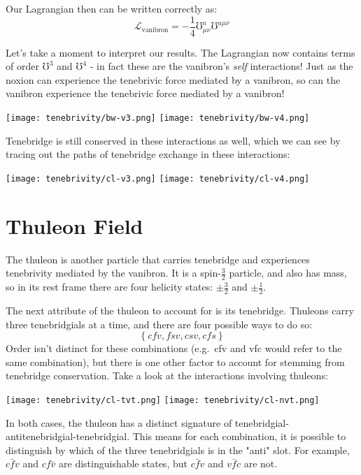 Our Lagrangian then can be written correctly as:
\[
  \mathcal{L}_{\text{vanibron}} = -\frac{1}{4} \mho^a_{\mu \nu} \mho^{a \mu \nu}
\]

Let's take a moment to interpret our results. The Lagrangian now contains terms of order \(\mho^3\) and \(\mho^4\) - in fact these are the vanibron's \textit{self} interactions! Just as the noxion can experience the tenebrivic force mediated by a vanibron, so can the vanibron experience the tenebrivic force mediated by a vanibron!
\begin{center}
  \texttt{[image: tenebrivity/bw-v3.png]}
  \texttt{[image: tenebrivity/bw-v4.png]}
\end{center}
Tenebridge is still conserved in these interactions as well, which we can see by tracing out the paths of tenebridge exchange in these interactions:
\begin{center}
  \texttt{[image: tenebrivity/cl-v3.png]}
  \texttt{[image: tenebrivity/cl-v4.png]}
\end{center}

\section{Thuleon Field}

The thuleon is another particle that carries tenebridge and experiences tenebrivity mediated by the vanibron. It is a spin-\(\frac{3}{2}\) particle, and also has mass, so in its rest frame there are four helicity states: \(\pm\frac{3}{2}\) and \(\pm\frac{1}{2}\).

The next attribute of the thuleon to account for is its tenebridge. Thuleons carry three tenebridgials at a time, and there are four possible ways to do so:
\[\left\{cfv,fsv,csv,cfs\right\}\]
Order isn't distinct for these combinations (e.g.\ cfv and vfc would refer to the same combination), but there is one other factor to account for stemming from tenebridge conservation. Take a look at the interactions involving thuleons:
\begin{center}
  \texttt{[image: tenebrivity/cl-tvt.png]}
  \texttt{[image: tenebrivity/cl-nvt.png]}
\end{center}

In both cases, the thuleon has a distinct signature of tenebridgial-antitenebridgial-tenebridgial. This means for each combination, it is possible to distinguish by which of the three tenebridgials is in the "anti" slot. For example, \(c\bar{f}v\) and \(cf\bar{v}\) are distinguishable states, but \(c\bar{f}v\) and \(v\bar{f}c\) are not.

